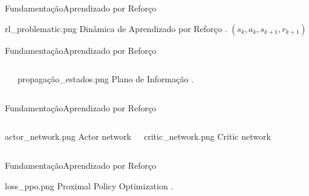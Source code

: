 \documentclass[
11pt,notheorems,hyperref={pdfauthor=Autor}
]{beamer}
\begin{document}
\begin{frame}{Fundamentação}{Aprendizado por Reforço}
    \pause
    \centering
    \begin{minipage}{0.7\textwidth}
        \FigureWithFallbackCaption
        {rl_problematic.png}
        {Dinâmica de Aprendizado por Reforço \cite{russell_artificial_2010}.}
        \centering
        \pause
        \Large{$(s_k,a_k,s_{k+1},r_{k+1})$}
    \end{minipage}
\end{frame}

\begin{frame}{Fundamentação}{Aprendizado por Reforço}
\pause
    \begin{columns}[T,onlytextwidth]
    
    \Large{
    }
    \Large{
    }
    \Large{
    }
    
    \FigureWithFallbackCaption
    {propagação_estados.png}
    {Plano de Informação \parencite{shwartz-ziv_opening_2017}.}
\end{columns}
\end{frame}

\begin{frame}{Fundamentação}{Aprendizado por Reforço}
    \pause
    \begin{columns}[T]
        \centering
        \begin{minipage}{0.7\textwidth}
            \FigureWithFallbackCaption
            {actor_network.png}
            {Actor network}    
        \end{minipage}

        \pause
        \centering
        \begin{minipage}{0.6\textwidth}
            \FigureWithFallbackCaption
            {critic_network.png}
            {Critic network}
        \end{minipage}
\end{columns}
\end{frame}

\begin{frame}{Fundamentação}{Aprendizado por Reforço}
    \pause
    \centering
    \begin{minipage}{0.7\textwidth}
        \FigureWithFallbackCaption
        {loss_ppo.png}
        {Proximal Policy Optimization \cite{schulman_proximal_2017}.}
    \end{minipage}
\end{frame}
\end{document}
